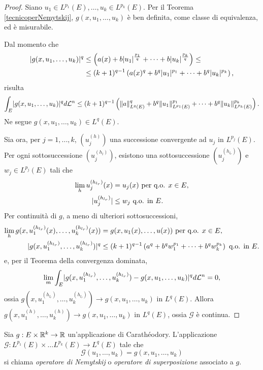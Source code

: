 \begin{proof}
	Siano $u_1 \in L^{p_1}(E),\dots ,u_k \in L^{p_k}(E)$. Per il Teorema \eqref{tecnicoperNemytskij}, $g(x, u_1, \dots, u_k)$ è ben definita, come classe di equivalenza, ed è misurabile.	
	
	Dal momento che
	\begin{align*}
		\lvert g(x,u_1,\dots,u_k)\rvert^q &\le \left( a(x) + b\lvert u_1\rvert^{\frac{p_1}{q}}+ \dots + b\lvert u_k\rvert^{\frac{p_k}{q}}\right) \le \\
		&\le (k+1)^{q-1}\left( a(x)^q + b^q\lvert u_1\rvert^{p_1}+ \dots + b^q\lvert u_k\rvert^{p_k}\right), 
	\end{align*}
	risulta
	\[ \int_E \lvert g(x,u_1,\dots,u_k)\rvert^q d \mathcal{L}^n \le (k+1)^{q-1} \left( \lVert a\rVert^{q}_{L^{q}(E)} + b^q\lVert u_1\rVert^{p_1}_{L^{p_1}(E)} +\dots + b^q\lVert u_k\rVert^{p_k}_{L^{p_k}(E)}\right) .\]
	Ne segue $g(x,u_1,\dots,u_k) \in L^q(E)$.
	
	Sia ora, per $j = 1, . . . , k$, $(u_j^{(h)})$ una successione convergente ad $u_j$ in $L^{p_j}(E)$. Per ogni sottosuccessione $(u_j^{(h_l)})$, esistono una sottosuccessione $(u_j^{(h_{l_r})})$ e $w_j \in L^{p_j}(E)$ tali che
	\begin{align*}
		\lim\limits_{h} u_j^{(h_{l_r})}(x) &= u_j(x) \textup{ per q.o. } x \in E,\\
		\lvert u_j^{(h_{l_r})}\rvert &\le w_j  \textup{ q.o. in }E.
	\end{align*}
	Per continuità di $g$, a meno di ulteriori sottosuccessioni,
	\begin{align*}
		\lim\limits_{h} g(x,u_1^{(h_{l_r})}(x),\dots,u_k^{(h_{l_r})}(x)) &= g(x,u_1(x),\dots,u(x)) \textup{ per q.o. } x \in E,\\
		\lvert g(x,u_1^{(h_{l_r})},\dots,u_k^{(h_{l_r})})\rvert^q &\le (k+1)^{q-1} \left( a^q + b^qw_1^{p_1} + \dots + b^qw_k^{p_k} \right)  \textup{ q.o. in }E.
	\end{align*}
	e, per il Teorema della convergenza dominata,
	\[ \lim\limits_{m} \int_E \lvert g(x,u_1^{(h_{l_r})},\dots,u_k^{(h_{l_r})})- g(x,u_1,\dots,u_k)\rvert^q d \mathcal{L}^n =0, \]
	ossia $g(x,u_1^{(h_{l_r})},\dots,u_k^{(h_{l_r})}) \to g(x,u_1,\dots,u_k)$ in $L^q(E)$. Allora $g(x,u_1^{(h)},\dots,u_k^{(h)}) \to g(x,u_1,\dots,u_k)$ in $L^q(E)$, ossia $\mathcal{G}$ è continua.
\end{proof}

\begin{definizione}
	Sia $g : E \times \mathbb{R}^k \to \mathbb{R}$ un'applicazione di Carathéodory. L'applicazione $\mathcal{G}: L^{p_1}(E) \times \dots L^{p_k}(E) \to L^q(E)$ tale che
	\[ \mathcal{G}(u_1,\dots,u_k) = g(x,u_1,\dots,u_k) \]
	si chiama \emph{operatore di Nemytskij} o \emph{operatore di superposizione} associato a $g$.
\end{definizione}

